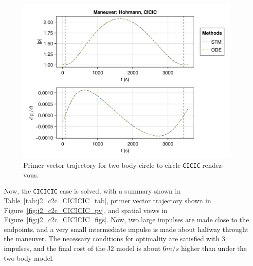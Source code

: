 \begin{figure}[htbp]
    \centering
    \includegraphics[width=\linewidth]{../results/j2/hohmann/CICIC_primer_vector.png}
    \caption{Primer vector trajectory for two body circle to circle \texttt{CICIC} rendez-vous.}
    \label{fig:j2_c2c_CICIC_pv}
\end{figure}

Now, the \texttt{CICICIC} case is solved, with a summary shown in Table~\ref{tab:j2_c2c_CICICIC_tab}, primer vector trajectory shown in Figure~\ref{fig:j2_c2c_CICICIC_pv}, and spatial views in Figure~\ref{fig:j2_c2c_CICICIC_figs}. Now, two large impulses are made close to the endpoints, and a very small intermediate impulse is made about halfway throught the maneuver. The necessary conditions for optimality are satisfied with 3 impulses, and the final cost of the J2 model is about \(6 m/s\) higher than under the two body model.



